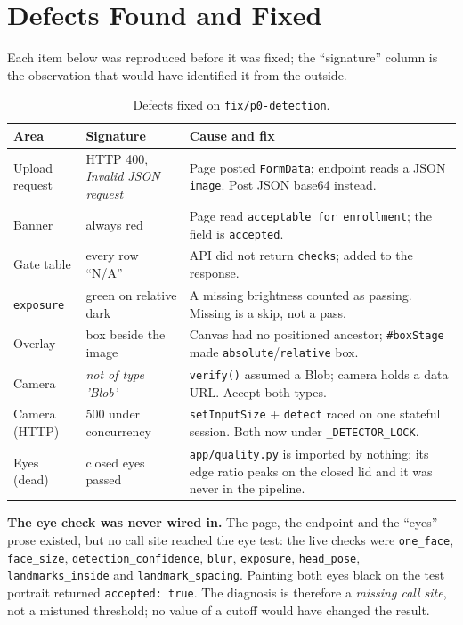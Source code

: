 \documentclass[11pt,a4paper]{article}
\newcommand{\coden}[1]{\texttt{\small #1}}
\begin{document}
\section{Defects Found and Fixed}
\label{sec:defects}

Each item below was reproduced before it was fixed; the ``signature''
column is the observation that would have identified it from the outside.

\begin{table}[H]
\centering
\caption{Defects fixed on \coden{fix/p0-detection}.}
\label{tab:defects}
\renewcommand{\arraystretch}{1.3}
\begin{tabularx}{\linewidth}{@{}l X X@{}}
\toprule
\textbf{Area} & \textbf{Signature} & \textbf{Cause and fix} \\
\midrule
Upload request & HTTP 400, \emph{Invalid JSON request} & Page posted \coden{FormData}; endpoint reads a JSON \coden{image}. Post JSON base64 instead. \\
Banner         & always red                 & Page read \coden{acceptable\_for\_enrollment}; the field is \coden{accepted}. \\
Gate table     & every row ``N/A''          & API did not return \coden{checks}; added to the response. \\
\coden{exposure} & green on relative dark     & A missing brightness counted as passing. Missing is a skip, not a pass. \\
Overlay        & box beside the image       & Canvas had no positioned ancestor; \coden{\#boxStage} made \coden{absolute}/\coden{relative} box. \\
Camera         & \emph{not of type 'Blob'}   & \coden{verify()} assumed a Blob; camera holds a data URL. Accept both types. \\
Camera (HTTP)  & 500 under concurrency      & \coden{setInputSize} + \coden{detect} raced on one stateful session. Both now under \coden{\_DETECTOR\_LOCK}. \\
Eyes (dead)    & closed eyes passed         & \coden{app/quality.py} is imported by nothing; its edge ratio peaks on the closed lid and it was never in the pipeline. \\
\bottomrule
\end{tabularx}
\end{table}

\begin{keybox}
\textbf{The eye check was never wired in.} The page, the endpoint and the
``eyes'' prose existed, but no call site reached the eye test: the live
checks were \coden{one\_face}, \coden{face\_size}, \coden{detection\_confidence},
\coden{blur}, \coden{exposure}, \coden{head\_pose}, \coden{landmarks\_inside}
and \coden{landmark\_spacing}. Painting both eyes black on the test
portrait returned \coden{accepted: true}. The diagnosis is therefore a
\emph{missing call site}, not a mistuned threshold; no value of a cutoff
would have changed the result.
\end{keybox}
\end{document}
